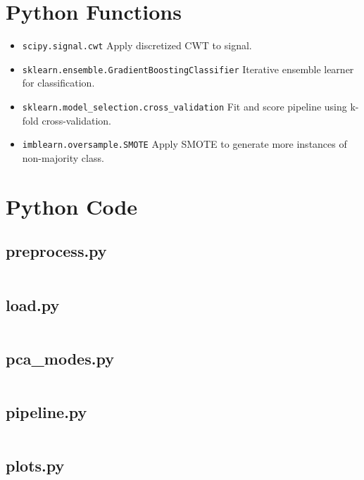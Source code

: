 \documentclass{article}
\begin{document}
\begin{appendices}
    \section{Python Functions}
        \label{sec:functions}
        \begin{itemize}
            \item \texttt{scipy.signal.cwt} Apply discretized CWT to signal.
            \item \texttt{sklearn.ensemble.GradientBoostingClassifier} Iterative
            ensemble learner for classification.
            \item \texttt{sklearn.model\_selection.cross\_validation} Fit and
            score pipeline using k-fold cross-validation.
            \item \texttt{imblearn.oversample.SMOTE} Apply SMOTE to generate
            more instances of non-majority class.
        \end{itemize}
    \section{Python Code}
        \label{sec:code}
    \subsection{preprocess.py}
        \label{subsec:preprocess}
        \inputminted{python}{preprocess.py}
    \subsection{load.py}
        \label{subsec:load}
        \inputminted{python}{load.py}
    \subsection{pca\_modes.py}
        \label{subsec:pca_modes}
        \inputminted{python}{pca_modes.py}
    \subsection{pipeline.py}
        \label{subsec:pipeline}
        \inputminted{python}{pipeline.py}
    \subsection{plots.py}
        \label{subsec:plots}
        \inputminted{python}{plots.py}

\end{appendices}
\end{document}

